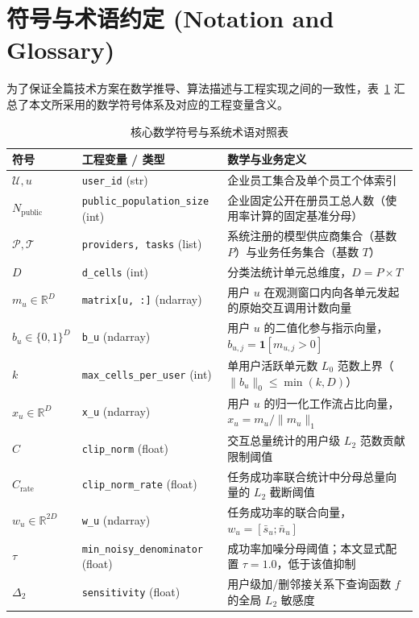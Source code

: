 \section*{符号与术语约定 (Notation and Glossary)}

为了保证全篇技术方案在数学推导、算法描述与工程实现之间的一致性，表~\ref{tab:notation} 汇总了本文所采用的数学符号体系及对应的工程变量含义。

\begin{table}[htbp]
\centering
\small
\caption{核心数学符号与系统术语对照表}
\label{tab:notation}
\begin{tabularx}{\textwidth}{llX}
\toprule
\textbf{符号} & \textbf{工程变量 / 类型} & \textbf{数学与业务定义} \\
\midrule
$\mathcal{U}, u$ & \texttt{user\_id} (str) & 企业员工集合及单个员工个体索引 \\
$N_{\text{public}}$ & \texttt{public\_population\_size} (int) & 企业固定公开在册员工总人数（使用率计算的固定基准分母） \\
$\mathcal{P}, \mathcal{T}$ & \texttt{providers, tasks} (list) & 系统注册的模型供应商集合（基数 $P$）与业务任务集合（基数 $T$） \\
$D$ & \texttt{d\_cells} (int) & 分类法统计单元总维度，$D = P \times T$ \\
$m_u \in \mathbb{R}^D$ & \texttt{matrix[u, :]} (ndarray) & 用户 $u$ 在观测窗口内向各单元发起的原始交互调用计数向量 \\
$b_u \in \{0, 1\}^D$ & \texttt{b\_u} (ndarray) & 用户 $u$ 的二值化参与指示向量，$b_{u,j} = \mathbf{1}[m_{u,j} > 0]$ \\
$k$ & \texttt{max\_cells\_per\_user} (int) & 单用户活跃单元数 $L_0$ 范数上界（$\|b_u\|_0 \le \min(k, D)$） \\
$x_u \in \mathbb{R}^D$ & \texttt{x\_u} (ndarray) & 用户 $u$ 的归一化工作流占比向量，$x_u = m_u / \|m_u\|_1$ \\
$C$ & \texttt{clip\_norm} (float) & 交互总量统计的用户级 $L_2$ 范数贡献限制阈值 \\
$C_{\text{rate}}$ & \texttt{clip\_norm\_rate} (float) & 任务成功率联合统计中分母总量向量的 $L_2$ 截断阈值 \\
$w_u \in \mathbb{R}^{2D}$ & \texttt{w\_u} (ndarray) & 任务成功率的联合向量，$w_u = [\bar{s}_u ; \bar{n}_u]$ \\
$\tau$ & \texttt{min\_noisy\_denominator} (float) & 成功率加噪分母阈值；本文显式配置 $\tau=1.0$，低于该值抑制 \\
$\Delta_2$ & \texttt{sensitivity} (float) & 用户级加/删邻接关系下查询函数 $f$ 的全局 $L_2$ 敏感度 \\

\end{tabularx}
\end{table}
